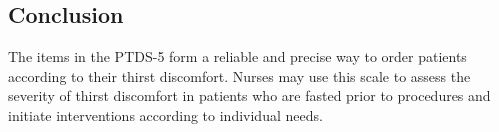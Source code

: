\documentclass[12pt,twocolumn,twoside,]{pinp}
\begin{document}
\hypertarget{conclusion}{%
\subsection{Conclusion}\label{conclusion}}

The items in the PTDS-5 form a reliable and precise way to order
patients according to their thirst discomfort. Nurses may use this scale
to assess the severity of thirst discomfort in patients who are fasted
prior to procedures and initiate interventions according to individual
needs.


\pnasbreak 



\end{document}
